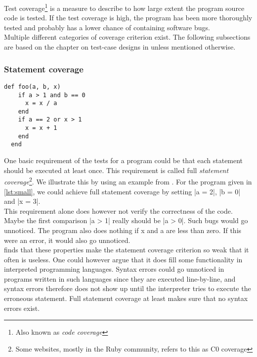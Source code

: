 \MakeShortVerb{\|}

\label{sec:theory_coverage} Test coverage\footnote{Also known as
\emph{code coverage}} is a measure to describe to how large extent the
program source code is tested. If the test coverage is high, the program
has been more thoroughly tested and probably has a lower chance of
containing software bugs. \cite{wiki:coverage}\\

Multiple different categories of coverage criterion exist. The
following subsections are based on the chapter on test-case designs in
\citet{book:art_of_testing} unless mentioned otherwise.\\


\subsubsection{Statement coverage}
\label{sec:theory_statement_coverage}
\begin{lstlisting}[caption=A small example program for explaining different test coverage concepts.,
                   label=lst:small, float=t]
  def foo(a, b, x)
    if a > 1 and b == 0
      x = x / a
    end
    if a == 2 or x > 1
      x = x + 1
    end
  end
\end{lstlisting}

One basic requirement of the tests for a program could be that each
statement should be executed at least once. This requirement is called
full \emph{statement coverage}\footnote{Some websites, mostly in the
Ruby community, refers to this as C0 coverage}. We illustrate this by
using an example from \citet{book:art_of_testing}. For the program given
in \ref{lst:small}, we could achieve full statement coverage by setting
|a = 2|, |b = 0| and |x = 3|.\\

This requirement alone does however not verify the correctness of the
code. Maybe the first comparison |a > 1| really should be |a > 0|. Such
bugs would go unnoticed. The program also does nothing if x and a are
less than zero. If this were an error, it would also go unnoticed.\\

\citeauthor{book:art_of_testing} finds that these properties make the
statement coverage criterion so weak that it often is useless. One could
however argue that it does fill some functionality in interpreted
programming languages. Syntax errors could go unnoticed in programs
written in such languages since they are executed line-by-line, and
syntax errors therefore does not show up until the interpreter tries to
execute the erroneous statement. Full statement coverage at least makes
sure that no syntax errors exist.\\


